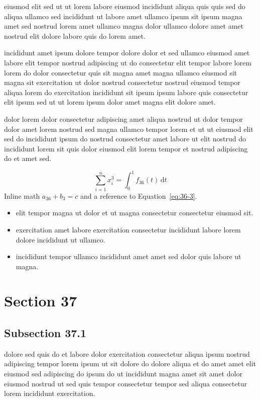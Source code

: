 \documentclass{article}
\begin{document}
eiusmod elit sed ut ut lorem labore eiusmod incididunt aliqua quis quis sed do aliqua ullamco sed incididunt ut labore amet ullamco ipsum sit ipsum magna amet sed nostrud lorem amet ullamco magna dolor ullamco dolore amet amet nostrud elit dolore labore quis do lorem amet.

incididunt amet ipsum dolore tempor dolore dolor et sed ullamco eiusmod amet labore elit tempor nostrud adipiscing ut do consectetur elit tempor labore lorem lorem do dolor consectetur quis sit magna amet magna ullamco eiusmod sit magna sit exercitation ut dolor nostrud consectetur nostrud eiusmod tempor aliqua lorem do exercitation incididunt sit ipsum ipsum labore quis consectetur elit ipsum sed ut ut lorem ipsum dolor amet magna elit dolore amet.

dolor lorem dolor consectetur adipiscing amet aliqua nostrud ut dolor tempor dolor amet lorem nostrud sed magna ullamco tempor lorem et ut ut eiusmod elit sed do incididunt ipsum do nostrud consectetur amet labore ut elit nostrud do incididunt lorem sit quis dolor eiusmod elit lorem tempor et nostrud adipiscing do et amet sed.

\begin{equation}\label{eq:36-3}
  \sum_{i=1}^{n} x_i^{3} = \int_0^1 f_{36}(t)\,\mathrm{d}t
\end{equation}
Inline math $a_{36} + b_{3} = c$ and a reference to Equation~\eqref{eq:36-3}.

\begin{itemize}
  \item elit tempor magna ut dolor et ut magna consectetur consectetur eiusmod sit.
  \item exercitation amet labore exercitation consectetur incididunt labore lorem dolore incididunt ut ullamco.
  \item incididunt tempor ullamco incididunt amet amet sed dolor quis labore ut magna.
\end{itemize}

\section{Section 37}\label{sec:37}
\subsection{Subsection 37.1}\label{sec:37-1}
dolore sed quis do et labore dolor exercitation consectetur aliqua ipsum nostrud adipiscing tempor lorem ipsum ut sit dolore do dolore aliqua et do amet amet elit eiusmod sed adipiscing do ipsum do ut incididunt magna amet sit amet dolor eiusmod nostrud ut sed quis tempor consectetur tempor sed aliqua consectetur lorem incididunt exercitation.
\end{document}

